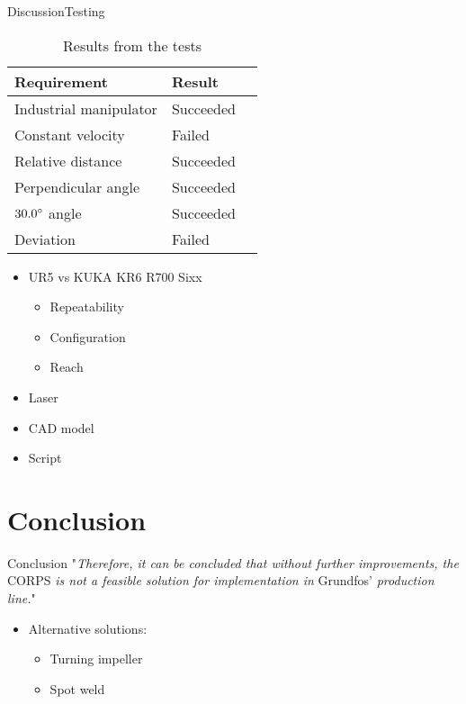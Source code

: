 \begin{frame}{Discussion}{Testing}
\begin{table}[]
    \centering
\begin{tabular}{l l l}
    \hline
    \rowcolor{beamer@barcolor}\textbf{Requirement} & \textbf{Result} \\
    \hline
    Industrial manipulator & Succeeded \\
    \rowcolor{beamer@barcolor}Constant velocity & Failed \\
    Relative distance & Succeeded\\
    \rowcolor{beamer@barcolor}Perpendicular angle & Succeeded\\
    $30.0\degree$ angle & Succeeded \\
    \rowcolor{beamer@barcolor}Deviation & Failed \\
    \hline
\end{tabular}
\caption{Results from the tests}
\end{table}
\begin{itemize}
    \item UR5 vs KUKA KR6 R700 Sixx
    \begin{itemize}
        \item Repeatability
        \item Configuration
        \item Reach
    \end{itemize} 
    \item Laser
    \item CAD model
    \item Script
\end{itemize}
\end{frame}

\section{Conclusion}
\begin{frame}{Conclusion}
"\textit{Therefore, it can be concluded that without further improvements, the} CORPS \textit{is not a feasible solution for implementation in }Grundfos’\textit{ production line.}"
\begin{itemize}
    \item Alternative solutions:
    \begin{itemize}
        \item Turning impeller
        \item Spot weld
    \end{itemize}
\end{itemize}
\end{frame}

